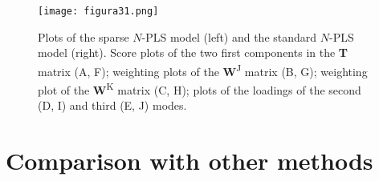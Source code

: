\begin{figure}[hbtp]
	\centering
\texttt{[image: figura31.png]}
\caption{Plots of the sparse $N$-PLS model (left) and the standard $N$-PLS model (right). Score plots of the two first components in the \textbf{T} matrix (A, F); weighting plots of the \textbf{W}\textsuperscript{J} matrix (B, G); weighting plot of the \textbf{W}\textsuperscript{K} matrix (C, H); plots of the loadings of the second (D, I) and third (E, J) modes.}
\label{figura31}
\end{figure}

\section{Comparison with other methods}